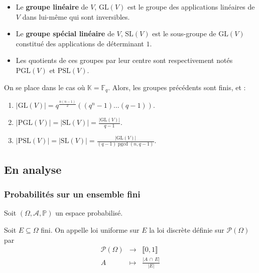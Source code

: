 	\begin{definition}
		\begin{itemize}
			\item Le \textbf{groupe linéaire} de $V$, $\mathrm{GL}(V)$ est le groupe des applications linéaires de $V$ dans lui-même qui sont inversibles.
			\item Le \textbf{groupe spécial linéaire} de $V$, $\mathrm{SL}(V)$ est le sous-groupe de $\mathrm{GL}(V)$ constitué des applications de déterminant $1$.
			\item Les quotients de ces groupes par leur centre sont respectivement notés $\mathrm{PGL}(V)$ et $\mathrm{PSL}(V)$.
		\end{itemize}
	\end{definition}
	
	
	\begin{proposition}
		On se place dans le cas où $\mathbb{K} = \mathbb{F}_q$. Alors, les groupes précédents sont finis, et :
		\begin{enumerate}[label=(\roman*)]
			\item $|\mathrm{GL}(V)| = q^{\frac{n(n-1)}{2}}((q^n-1) \dots (q-1))$.
			\item $|\mathrm{PGL}(V)| = |\mathrm{SL}(V)| = \frac{|\mathrm{GL}(V)|}{q-1}$.
			\item $|\mathrm{PSL}(V)| = |\mathrm{SL}(V)| = \frac{|\mathrm{GL}(V)|}{(q-1)\operatorname{pgcd}(n,q-1)}$.
		\end{enumerate}
	\end{proposition}
	
	\subsection{En analyse}
	
	\subsubsection{Probabilités sur un ensemble fini}
	
	
	Soit $(\Omega, \mathcal{A}, \mathbb{P})$ un espace probabilisé.
	
	\begin{definition}
		Soit $E \subseteq \Omega$ fini. On appelle loi uniforme sur $E$ la loi discrète définie sur $\mathcal{P}(\Omega)$ par
		\[
		\begin{array}{ccc}
			\mathcal{P}(\Omega) &\rightarrow& \llbracket 0, 1 \rrbracket \\
			A &\mapsto& \frac{\vert A \, \cap \, E \vert}{\vert E \vert}
		\end{array}
		\]
	\end{definition}
	
